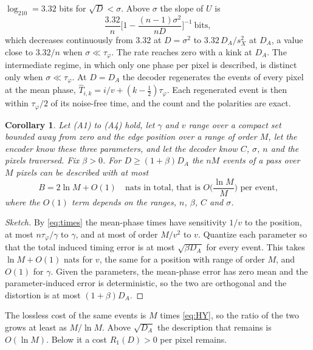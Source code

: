 \documentclass[10pt]{article}
\newtheorem{corollary}{Corollary}
\theoremstyle{remark}
\newcommand{\tphi}{\tau_\varphi}
\begin{document}
$\log_210=3.32$ bits for $\sqrt D<\sigma$. Above $\sigma$ the slope of $U$ is
\begin{equation}\label{eq:slope}
  \frac{3.32}{n}\Big[1-\frac{(n-1)\sigma^2}{nD}\Big]^{-1}\ \text{bits},
\end{equation}
which decreases continuously from $3.32$ at $D=\sigma^2$ to $3.32\,D_A/s_X^2$ at $D_A$, a value
close to $3.32/n$ when $\sigma\ll\tphi$. The rate reaches zero with a kink at $D_A$. The intermediate regime, in which only one phase per pixel is described,
is distinct only when $\sigma\ll\tphi$. At $D=D_A$ the decoder regenerates the events of every
pixel at the mean phase, $\hat T_{i,k}=i/v+(k-\tfrac12)\tphi$. Each regenerated event is then within
$\tphi/2$ of its noise-free time, and the count and the polarities are exact.

\begin{corollary}\label{cor:path}
Let (A1) to (A4) hold, let $\gamma$ and $v$ range over a compact set bounded away from zero and
the edge position over a range of order $M$, let the encoder know these three parameters, and let
the decoder know $C$, $\sigma$, $n$ and the pixels traversed. Fix $\beta>0$. For
$D\ge(1+\beta)D_A$ the $nM$ events of a pass over $M$ pixels can be described with at most
\begin{equation}\label{eq:B}
  B=2\ln M+O(1)\quad\text{nats in total, that is } O\!\Big(\frac{\ln M}{M}\Big)\text{ per event,}
\end{equation}
where the $O(1)$ term depends on the ranges, $n$, $\beta$, $C$ and $\sigma$.
\end{corollary}
\begin{proof}[Sketch]
By \eqref{eq:times} the mean-phase times have sensitivity $1/v$ to the position, at most
$n\tphi/\gamma$ to $\gamma$, and at most of order $M/v^2$ to $v$. Quantize each parameter so that
the total induced timing error is at most $\sqrt{\beta D_A}$ for every event. This takes $\ln M+O(1)$
nats for $v$, the same for a position with range of order $M$, and $O(1)$ for $\gamma$. Given the
parameters, the mean-phase error has zero mean and the parameter-induced error is deterministic,
so the two are orthogonal and the distortion is at most $(1+\beta)D_A$.
\end{proof}
The lossless cost of the same events is $M$ times \eqref{eq:HY}, so the ratio of the two grows at
least as $M/\ln M$. Above $\sqrt{D_A}$ the description that
remains is $O(\ln M)$. Below it a cost $R_1(D)>0$ per pixel remains.
\end{document}
